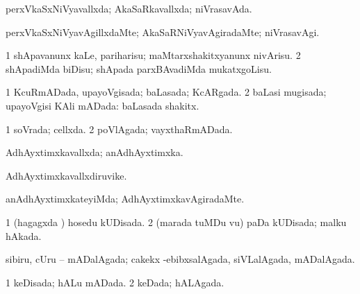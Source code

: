 {{\bentry
{} 
\gl{\gu}
\expl{}
\bmng
perxVkaSxNiVyavallxda; AkaSaRkavallxda; niVrasavAda. 
\emng
\eentry

\bentry
{} 
\gl{\kirxvi}
\expl{}
\bmng
perxVkaSxNiVyavAgillxdaMte; AkaSaRNiVyavAgiradaMte; niVrasavAgi. 
\emng
\eentry

\bentry
{} 
\gl{\sakirx}
\expl{}
\bmng
\bnum
\num{1} shApavanunx kaLe, pariharisu; maMtarxshakitxyanunx nivArisu. 
\num{2} shApadiMda biDisu; shApada parxBAvadiMda mukatxgoLisu. 
\enum
\emng
\eentry

\bentry
{} 
\gl{\gu}
\expl{}
\bmng
\bnum
\num{1} KcuRmADada, upayoVgisada; baLasada; KcARgada. 
\num{2} baLasi mugisada; upayoVgisi KAli mADada:  baLasada shakitx. 
\enum
\emng
\eentry

\bentry
{} 
\gl{\gu}
\expl{}
\bmng
\bnum
\num{1} soVrada; cellxda. 
\num{2} poVlAgada; vayxthaRmADada. 
\enum
\emng
\eentry

\bentry
{} 
\gl{\gu}
\expl{}
\bmng
{} 
\emng
\eentry

\bentry
{} 
\gl{\gu}
\expl{}
\bmng
AdhAyxtimxkavallxda; anAdhAyxtimxka. 
\emng
\eentry

\bentry
{} 
\gl{\nA}
\expl{}
\bmng
AdhAyxtimxkavallxdiruvike. 
\emng
\eentry

\bentry
{} 
\gl{\kirxvi}
\expl{}
\bmng
anAdhAyxtimxkateyiMda; AdhAyxtimxkavAgiradaMte. 
\emng
\eentry

\bentry
{} 
\gl{\nA}
\expl{}
\bmng
{} 
\emng
\eentry

\bentry
{} 
\gl{\gu}
\expl{}
\bmng
\bnum
\num{1} (hagagxda \vi) hosedu kUDisada. 
\num{2} (marada tuMDu \mo vu) paDa kUDisada; malku hAkada. 
\enum
\emng
\eentry

\bentry
{} 
\gl{\gu}
\expl{}
\bmng
sibiru, cUru -- mADalAgada; cakekx -ebibxsalAgada, siVLalAgada, mADalAgada. 
\emng
\eentry

\bentry
{} 
\gl{\gu}
\expl{}
\bmng
\bnum
\num{1} keDisada; hALu mADada. 
\num{2} keDada; hALAgada. 
\enum
\emng
\eentry

}}
